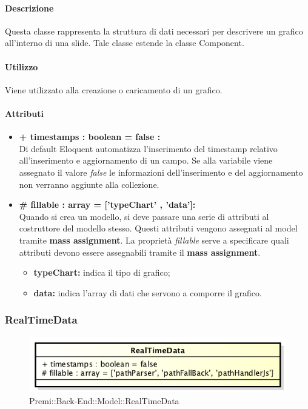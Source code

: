 	\paragraph{Descrizione}
	Questa classe rappresenta la struttura di dati necessari per descrivere un grafico all'interno di una \gls{slide}. Tale classe estende la classe Component.
	
	\paragraph{Utilizzo}
	Viene utilizzato alla creazione o caricamento di un grafico.

	\paragraph{Attributi}
	\begin{itemize}
		\item \textbf{+ timestamps : boolean = false :}\\
		Di default Eloquent automatizza l'inserimento del timestamp relativo all'inserimento e aggiornamento di un campo. Se alla variabile viene assegnato il valore \textit{false} le informazioni dell'inserimento e del aggiornamento non verranno aggiunte alla collezione.
		\item \textbf{\# fillable : array = [’typeChart’ , ’data’]:}\\
		Quando si crea un modello, si deve passare una serie di attributi al costruttore del modello stesso. Questi attributi vengono assegnati al model tramite \textbf{mass assignment}. La proprietà \textit{fillable} serve a specificare quali attributi devono essere assegnabili tramite il \textbf{mass assignment}.
		\begin{itemize}
			\item \textbf{typeChart:} indica il tipo di grafico;
			\item \textbf{data:} indica l'array di dati che servono a comporre il grafico.
		\end{itemize}
		
	\end{itemize}
\newpage


\subsubsection{RealTimeData}

	\begin{figure}[h]
		\centering
		\includegraphics[width=0.5\linewidth]{img/back_end_premi_model_realTimeData}
		\caption[Premi::Back-End::Model::RealTimeData]{Premi::Back-End::Model::RealTimeData}
		\label{fig:back_end_premi_model_realTimeData}
	\end{figure}


